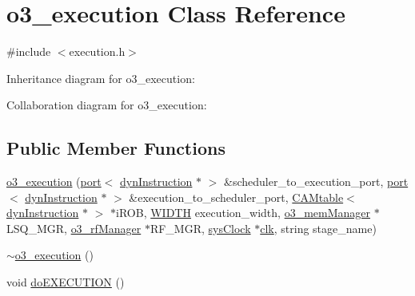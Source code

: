 \hypertarget{classo3__execution}{
\section{o3\_\-execution Class Reference}
\label{classo3__execution}
}


{\ttfamily \#include $<$execution.h$>$}



Inheritance diagram for o3\_\-execution:


Collaboration diagram for o3\_\-execution:
\subsection*{Public Member Functions}
\begin{DoxyCompactItemize}
\item 
\hyperlink{classo3__execution_afa2a91e452a8de5ce259b9b087d07404}{o3\_\-execution} (\hyperlink{classport}{port}$<$ \hyperlink{classdynInstruction}{dynInstruction} $\ast$ $>$ \&scheduler\_\-to\_\-execution\_\-port, \hyperlink{classport}{port}$<$ \hyperlink{classdynInstruction}{dynInstruction} $\ast$ $>$ \&execution\_\-to\_\-scheduler\_\-port, \hyperlink{classCAMtable}{CAMtable}$<$ \hyperlink{classdynInstruction}{dynInstruction} $\ast$ $>$ $\ast$iROB, \hyperlink{global_2global_8h_a6fa2e24b8a418fa215e183264cbea3aa}{WIDTH} execution\_\-width, \hyperlink{classo3__memManager}{o3\_\-memManager} $\ast$LSQ\_\-MGR, \hyperlink{classo3__rfManager}{o3\_\-rfManager} $\ast$RF\_\-MGR, \hyperlink{classsysClock}{sysClock} $\ast$\hyperlink{g__objs_8h_afc4784c140eed1743728e83840e91c12}{clk}, string stage\_\-name)
\item 
\hyperlink{classo3__execution_a33a63fc56bf57ef6a470fbad5af5efcc}{$\sim$o3\_\-execution} ()
\item 
void \hyperlink{classo3__execution_a533f0e0e815b90e1eefb5de8fe16c61d}{doEXECUTION} ()
\end{DoxyCompactItemize}


